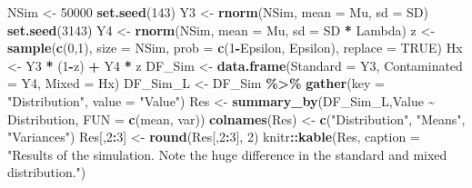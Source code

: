 \documentclass[
]{article}
\newenvironment{Shaded}{\begin{snugshade}}{\end{snugshade}}
\newcommand{\AttributeTok}[1]{\textcolor[rgb]{0.13,0.29,0.53}{#1}}
\newcommand{\ConstantTok}[1]{\textcolor[rgb]{0.56,0.35,0.01}{#1}}
\newcommand{\DecValTok}[1]{\textcolor[rgb]{0.00,0.00,0.81}{#1}}
\newcommand{\FunctionTok}[1]{\textcolor[rgb]{0.13,0.29,0.53}{\textbf{#1}}}
\newcommand{\NormalTok}[1]{#1}
\newcommand{\OtherTok}[1]{\textcolor[rgb]{0.56,0.35,0.01}{#1}}
\newcommand{\SpecialCharTok}[1]{\textcolor[rgb]{0.81,0.36,0.00}{\textbf{#1}}}
\newcommand{\StringTok}[1]{\textcolor[rgb]{0.31,0.60,0.02}{#1}}
\begin{document}
\begin{Shaded}
\begin{Highlighting}[]
\NormalTok{  NSim }\OtherTok{\textless{}{-}} \DecValTok{50000}
  \FunctionTok{set.seed}\NormalTok{(}\DecValTok{143}\NormalTok{)}
\NormalTok{  Y3 }\OtherTok{\textless{}{-}} \FunctionTok{rnorm}\NormalTok{(NSim, }\AttributeTok{mean =}\NormalTok{ Mu, }\AttributeTok{sd =}\NormalTok{ SD)}
  \FunctionTok{set.seed}\NormalTok{(}\DecValTok{3143}\NormalTok{)}
\NormalTok{  Y4 }\OtherTok{\textless{}{-}} \FunctionTok{rnorm}\NormalTok{(NSim, }\AttributeTok{mean =}\NormalTok{ Mu, }\AttributeTok{sd =}\NormalTok{ SD }\SpecialCharTok{*}\NormalTok{ Lambda)}
\NormalTok{  z  }\OtherTok{\textless{}{-}} \FunctionTok{sample}\NormalTok{(}\FunctionTok{c}\NormalTok{(}\DecValTok{0}\NormalTok{,}\DecValTok{1}\NormalTok{),}
               \AttributeTok{size    =}\NormalTok{ NSim,}
               \AttributeTok{prob    =} \FunctionTok{c}\NormalTok{(}\DecValTok{1}\SpecialCharTok{{-}}\NormalTok{Epsilon, Epsilon),}
               \AttributeTok{replace =} \ConstantTok{TRUE}\NormalTok{)}
\NormalTok{  Hx            }\OtherTok{\textless{}{-}}\NormalTok{ Y3 }\SpecialCharTok{*}\NormalTok{ (}\DecValTok{1}\SpecialCharTok{{-}}\NormalTok{z) }\SpecialCharTok{+}\NormalTok{ Y4 }\SpecialCharTok{*}\NormalTok{ z}
\NormalTok{  DF\_Sim        }\OtherTok{\textless{}{-}} \FunctionTok{data.frame}\NormalTok{(}\AttributeTok{Standard =}\NormalTok{ Y3, }\AttributeTok{Contaminated =}\NormalTok{ Y4, }\AttributeTok{Mixed =}\NormalTok{ Hx)}
\NormalTok{  DF\_Sim\_L      }\OtherTok{\textless{}{-}}\NormalTok{ DF\_Sim }\SpecialCharTok{\%\textgreater{}\%} \FunctionTok{gather}\NormalTok{(}\AttributeTok{key =} \StringTok{"Distribution"}\NormalTok{, }\AttributeTok{value =} \StringTok{"Value"}\NormalTok{)}
\NormalTok{  Res           }\OtherTok{\textless{}{-}} \FunctionTok{summary\_by}\NormalTok{(DF\_Sim\_L,Value }\SpecialCharTok{\textasciitilde{}}\NormalTok{ Distribution, }\AttributeTok{FUN =} \FunctionTok{c}\NormalTok{(mean, var))}
  \FunctionTok{colnames}\NormalTok{(Res) }\OtherTok{\textless{}{-}} \FunctionTok{c}\NormalTok{(}\StringTok{"Distribution"}\NormalTok{, }\StringTok{"Means"}\NormalTok{, }\StringTok{"Variances"}\NormalTok{)}
\NormalTok{  Res[,}\DecValTok{2}\SpecialCharTok{:}\DecValTok{3}\NormalTok{]     }\OtherTok{\textless{}{-}} \FunctionTok{round}\NormalTok{(Res[,}\DecValTok{2}\SpecialCharTok{:}\DecValTok{3}\NormalTok{], }\DecValTok{2}\NormalTok{)}
\NormalTok{  knitr}\SpecialCharTok{::}\FunctionTok{kable}\NormalTok{(Res, }\AttributeTok{caption =} \StringTok{"Results of the simulation. Note the huge difference in the standard and mixed distribution."}\NormalTok{)}
\end{Highlighting}
\end{Shaded}
\end{document}
